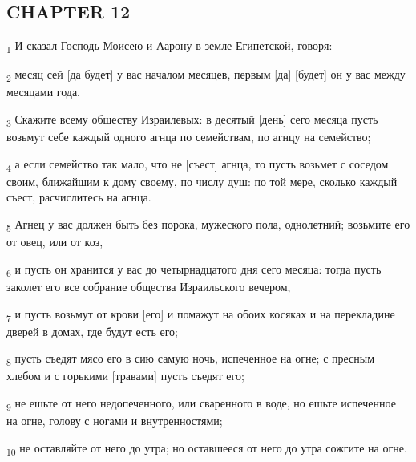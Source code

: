 \subsection{CHAPTER 12}
\begin{tcolorbox}
\textsubscript{1} И сказал Господь Моисею и Аарону в земле Египетской, говоря:
\end{tcolorbox}
\begin{tcolorbox}
\textsubscript{2} месяц сей [да будет] у вас началом месяцев, первым [да] [будет] он у вас между месяцами года.
\end{tcolorbox}
\begin{tcolorbox}
\textsubscript{3} Скажите всему обществу Израилевых: в десятый [день] сего месяца пусть возьмут себе каждый одного агнца по семействам, по агнцу на семейство;
\end{tcolorbox}
\begin{tcolorbox}
\textsubscript{4} а если семейство так мало, что не [съест] агнца, то пусть возьмет с соседом своим, ближайшим к дому своему, по числу душ: по той мере, сколько каждый съест, расчислитесь на агнца.
\end{tcolorbox}
\begin{tcolorbox}
\textsubscript{5} Агнец у вас должен быть без порока, мужеского пола, однолетний; возьмите его от овец, или от коз,
\end{tcolorbox}
\begin{tcolorbox}
\textsubscript{6} и пусть он хранится у вас до четырнадцатого дня сего месяца: тогда пусть заколет его все собрание общества Израильского вечером,
\end{tcolorbox}
\begin{tcolorbox}
\textsubscript{7} и пусть возьмут от крови [его] и помажут на обоих косяках и на перекладине дверей в домах, где будут есть его;
\end{tcolorbox}
\begin{tcolorbox}
\textsubscript{8} пусть съедят мясо его в сию самую ночь, испеченное на огне; с пресным хлебом и с горькими [травами] пусть съедят его;
\end{tcolorbox}
\begin{tcolorbox}
\textsubscript{9} не ешьте от него недопеченного, или сваренного в воде, но ешьте испеченное на огне, голову с ногами и внутренностями;
\end{tcolorbox}
\begin{tcolorbox}
\textsubscript{10} не оставляйте от него до утра; но оставшееся от него до утра сожгите на огне.
\end{tcolorbox}
